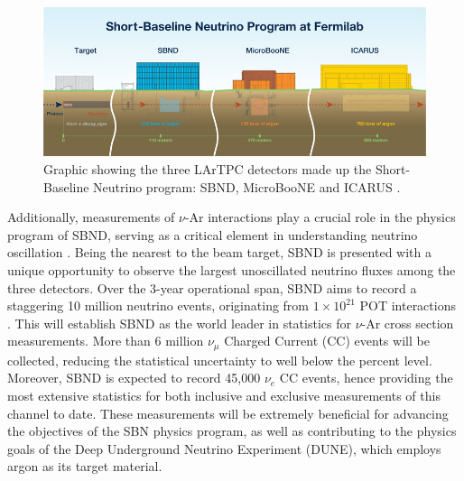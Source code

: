 \begin{figure}[htbp] 
\centering    
\includegraphics[width=1.0\textwidth]{SBN_program}
\caption[Short-Baseline Neutrino Program]{
Graphic showing the three LArTPC detectors made up the Short-Baseline Neutrino program: SBND, MicroBooNE and ICARUS \cite{SBNProgram}.
}
\label{fig:SBN_program}
\end{figure}

Additionally, measurements of $\nu$-Ar interactions play a crucial role in the physics program of SBND, serving as a critical element in understanding neutrino oscillation \cite{NuSTECWhitePaper}. 
Being the nearest to the beam target, SBND is presented with a unique opportunity to observe the largest unoscillated neutrino fluxes among the three detectors.
Over the 3-year operational span, SBND aims to record a staggering 10 million neutrino events, originating from $1 \times 10^{21}$ POT interactions \cite{SBNProgram}.
This will establish SBND as the world leader in statistics for $\nu$-Ar cross section measurements.
More than 6 million $\nu_{\mu}$ Charged Current (CC) events will be collected, reducing the statistical uncertainty to well below the percent level.
Moreover, SBND is expected to record 45,000 $\nu_{e}$ CC events, hence providing the most extensive statistics for both inclusive and exclusive measurements of this channel to date.
These measurements will be extremely beneficial for advancing the objectives of the SBN physics program, as well as contributing to the physics goals of the Deep Underground Neutrino Experiment (DUNE), which employs argon as its target material.

